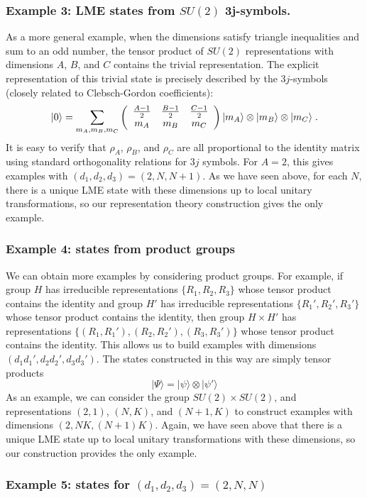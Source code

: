 \documentclass[12pt]{article}
\theoremstyle{definition}
\newcommand{\be}{\begin{equation}}
\newcommand{\ee}{\end{equation}}
\newcommand{\ba}{\begin{array}}
\newcommand{\ea}{\end{array}}
\begin{document}
\subsubsection*{Example 3: LME states from $SU(2)$ 3j-symbols.}

As a more general example, when the dimensions satisfy triangle inequalities and sum to an odd number, the tensor product of $SU(2)$ representations with dimensions $A$, $B$, and $C$ contains the trivial representation. The explicit representation of this trivial state is precisely described by the $3j$-symbols (closely related to Clebsch-Gordon coefficients):
\be
|0 \rangle =  \sum_{m_A,m_B,m_C} \left( \ba{ccc} \frac{A - 1}{2} & \frac{B - 1}{2} & \frac{C - 1}{2} \cr
m_A & m_B & m_C \ea \right) |m_A \rangle  \otimes |m_B \rangle  \otimes |m_C \rangle \; .
\ee
It is easy to verify that $\rho_A$, $\rho_B$, and $\rho_C$ are all proportional to the identity matrix using standard orthogonality relations for $3j$ symbols. For $A=2$, this gives examples with $(d_1,d_2,d_3) = (2,N,N+1)$. As we have seen above, for each $N$, there is a unique LME state with these dimensions up to local unitary transformations, so our representation theory construction gives the only example.

\subsubsection*{Example 4: states from product groups}

We can obtain more examples by considering product groups. For example, if group $H$ has irreducible representations $\{R_1,R_2,R_3\}$ whose tensor product contains the identity and group $H'$ has irreducible representations $\{R_1',R_2',R_3'\}$ whose tensor product contains the identity, then group $H \times H'$ has representations $\{(R_1,R_1'),(R_2,R_2'),(R_3,R_3')\}$ whose tensor product contains the identity. This allows us to build examples with dimensions $(d_1 d_1',d_2 d_2', d_3 d_3')$. The states constructed in this way are simply tensor products
\be
|\Psi \rangle = |\psi \rangle  \otimes |\psi' \rangle
\ee
As an example, we can consider the group $SU(2) \times SU(2)$, and representations $(2,1)$, $(N,K)$, and $(N+1,K)$ to construct examples with dimensions $(2,NK,(N+1)K)$. Again, we have seen above that there is a unique LME state up to local unitary transformations with these dimensions, so our construction provides the only example.

\subsubsection*{Example 5: states for $(d_1,d_2,d_3) = (2,N,N)$}
\end{document}
